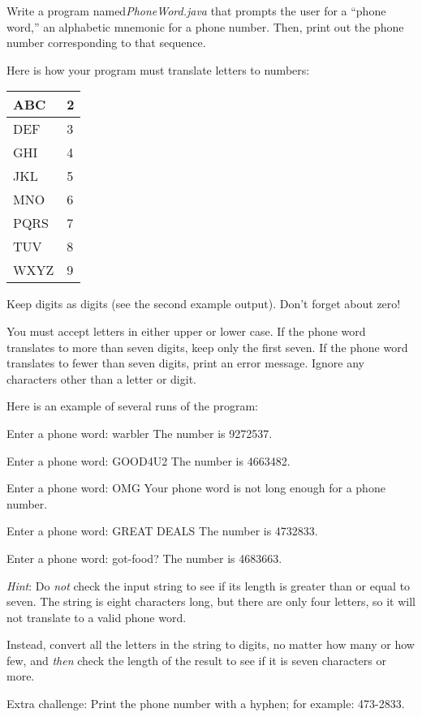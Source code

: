 \begin{exercise}
Write a program named{\it PhoneWord.java} that prompts the user for a ``phone word,'' an alphabetic mnemonic for a phone number. Then, print out the phone number corresponding to that sequence.

Here is how your program must translate letters to numbers:

\begin{tabular}{|l|l|}
\hline
ABC & 2 \\ \hline
DEF & 3 \\ \hline
GHI & 4 \\ \hline
JKL & 5 \\ \hline
MNO & 6 \\ \hline
PQRS & 7 \\ \hline
TUV & 8  \\ \hline
WXYZ & 9  \\ \hline
\end{tabular}

Keep digits as digits (see the second example output). Don't forget about zero!

You must accept letters in either upper or lower case. If the phone word translates to more than seven digits, keep only the first seven. If the phone word translates to fewer than seven digits, print an error message. Ignore any characters other than a letter or digit.

Here is an example of several runs of the program:

\begin{stdout}
Enter a phone word: warbler
The number is 9272537.

Enter a phone word: GOOD4U2
The number is 4663482.

Enter a phone word: OMG
Your phone word is not long enough for a phone number.

Enter a phone word: GREAT DEALS
The number is 4732833.

Enter a phone word: got-food?
The number is 4683663.

\end{stdout}

{\em Hint}: Do {\em not} check the input string to see if its length is greater than or equal to seven. The string 
 is eight characters long, but there are only four letters, so it will not translate to a valid phone word.

Instead, convert all the letters in the string to digits, no matter how many or how few, and {\em then} check the length of the result to see if it is seven characters or more.

Extra challenge: Print the phone number with a hyphen; for example: \mbox{473-2833}.

\end{exercise}

